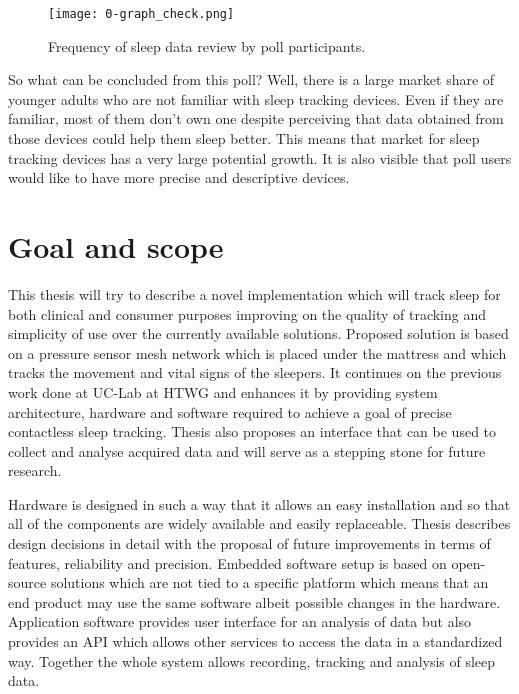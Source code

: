 \begin{figure}[h]
  \begin{center}
    \texttt{[image: 0-graph\_check.png]}
  \end{center}
  \caption{Frequency of sleep data review by poll participants.}
  \label{fig:check}
\end{figure}

So what can be concluded from this poll? Well, there is a large market share of younger adults who are not familiar with sleep tracking devices. Even if they are familiar, most of them don't own one despite perceiving that data obtained from those devices could help them sleep better. This means that market for sleep tracking devices has a very large potential growth. It is also visible that poll users would like to have more precise and descriptive devices.


\section{Goal and scope}

This thesis will try to describe a novel implementation which will track sleep for both clinical and consumer purposes improving on the quality of tracking and simplicity of use over the currently available solutions. Proposed solution is based on a pressure sensor mesh network which is placed under the mattress and which tracks the movement and vital signs of the sleepers. It continues on the previous work done at \ac{UC-Lab} at \ac{HTWG} and enhances it by providing system architecture, hardware and software required to achieve a goal of precise contactless sleep tracking. Thesis also proposes an interface that can be used to collect and analyse acquired data and will serve as a stepping stone for future research.

Hardware is designed in such a way that it allows an easy installation and so that all of the components are widely available and easily replaceable. Thesis describes design decisions in detail with the proposal of future improvements in terms of features, reliability and precision. Embedded software setup is based on open-source solutions which are not tied to a specific platform which means that an end product may use the same software albeit possible changes in the hardware. Application software provides user interface for an analysis of data but also provides an \ac{API} which allows other services to access the data in a standardized way. Together the whole system allows recording, tracking and analysis of sleep data.

